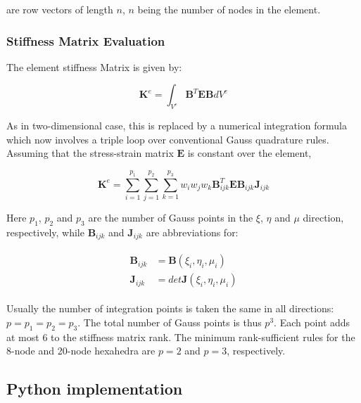 \documentclass[10pt,b5paper,titlepage]{book}
\newenvironment{eqarray}
{
    \begin{eqnarray}
        \begin{aligned}
}
{
        \end{aligned}
    \end{eqnarray}
}
\begin{document}
are row vectors of length $ n $, $ n $ being the number of nodes in the element.



\subsubsection{Stiffness Matrix Evaluation}

The element stiffness Matrix is given by:

\begin{equation}
    \mathbf{K}^e = \int_{V^e} \mathbf{B}^T \mathbf{E} \mathbf{B} dV^e
\end{equation}

As in two-dimensional case, this is replaced by a numerical integration formula which
now involves a triple loop over conventional Gauss quadrature rules. Assuming that
the stress-strain matrix $ \mathbf{E} $ is constant over the element,

\begin{equation}
    \mathbf{K}^e = \sum_{i=1}^{p_1} \sum_{j=1}^{p_2} \sum_{k=1}^{p_3}
    w_i w_j w_k \mathbf{B}_{ijk}^T \mathbf{E} \mathbf{B}_{ijk} \mathbf{J}_{ijk}
\end{equation}

Here $ p_1 $, $ p_2 $ and $ p_3 $ are the number of Gauss points in the $ \xi $,
$ \eta $ and $ \mu $ direction, respectively, while $ \mathbf{B}_{ijk} $
and $ \mathbf{J}_{ijk} $ are abbreviations for:

\begin{eqarray}
    \mathbf{B}_{ijk} &= \mathbf{B} \left(\xi_i, \eta_i, \mu_i\right) \\
    \mathbf{J}_{ijk} &= det \mathbf{J} \left(\xi_i, \eta_i, \mu_i\right)
\end{eqarray}

Usually the number of integration points is taken the same in all directions:
$ p = p_1 = p_2 = p_3 $. The total number of Gauss points is thus $ p^3 $.
Each point adds at most 6 to the stiffness matrix rank. The minimum rank-sufficient
rules for the 8-node and 20-node hexahedra are $ p = 2 $ and $ p = 3 $, respectively.


\subsection{Python implementation}
\end{document}
